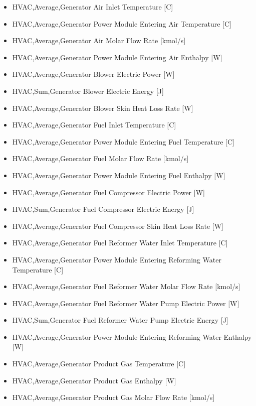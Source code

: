 \begin{itemize}
\item
  HVAC,Average,Generator Air Inlet Temperature {[}C{]}
\item
  HVAC,Average,Generator Power Module Entering Air Temperature {[}C{]}
\item
  HVAC,Average,Generator Air Molar Flow Rate {[}kmol/s{]}
\item
  HVAC,Average,Generator Power Module Entering Air Enthalpy {[}W{]}
\item
  HVAC,Average,Generator Blower Electric Power {[}W{]}
\item
  HVAC,Sum,Generator Blower Electric Energy {[}J{]}
\item
  HVAC,Average,Generator Blower Skin Heat Loss Rate {[}W{]}
\item
  HVAC,Average,Generator Fuel Inlet Temperature {[}C{]}
\item
  HVAC,Average,Generator Power Module Entering Fuel Temperature {[}C{]}
\item
  HVAC,Average,Generator Fuel Molar Flow Rate {[}kmol/s{]}
\item
  HVAC,Average,Generator Power Module Entering Fuel Enthalpy {[}W{]}
\item
  HVAC,Average,Generator Fuel Compressor Electric Power {[}W{]}
\item
  HVAC,Sum,Generator Fuel Compressor Electric Energy {[}J{]}
\item
  HVAC,Average,Generator Fuel Compressor Skin Heat Loss Rate {[}W{]}
\item
  HVAC,Average,Generator Fuel Reformer Water Inlet Temperature {[}C{]}
\item
  HVAC,Average,Generator Power Module Entering Reforming Water Temperature {[}C{]}
\item
  HVAC,Average,Generator Fuel Reformer Water Molar Flow Rate {[}kmol/s{]}
\item
  HVAC,Average,Generator Fuel Reformer Water Pump Electric Power {[}W{]}
\item
  HVAC,Sum,Generator Fuel Reformer Water Pump Electric Energy {[}J{]}
\item
  HVAC,Average,Generator Power Module Entering Reforming Water Enthalpy {[}W{]}
\item
  HVAC,Average,Generator Product Gas Temperature {[}C{]}
\item
  HVAC,Average,Generator Product Gas Enthalpy {[}W{]}
\item
  HVAC,Average,Generator Product Gas Molar Flow Rate {[}kmol/s{]}

\end{itemize}
